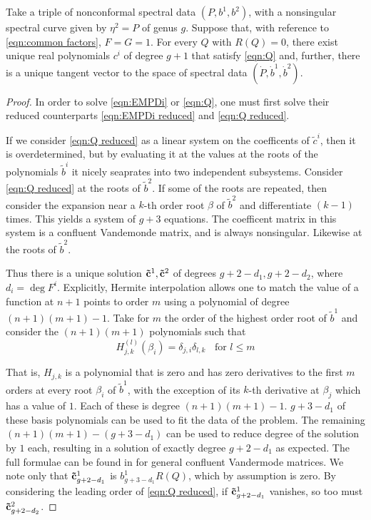 \begin{lem}[Nonconformal, $F=G=1$]
Take a triple of nonconformal spectral data $(P,b^1,b^2)$, with a nonsingular spectral curve given by $η^2 = P$ of genus $g$. Suppose that, with reference to \eqref{eqn:common factors}, $F=G=1$. For every $Q$ with $R(Q) = 0$, there exist unique real polynomials $c^i$ of degree $g+1$ that satisfy \eqref{eqn:Q} and, further, there is a unique tangent vector to the space of spectral data $(\dot P, \dot b^1, \dot b^2)$.

\begin{proof}
In order to solve \eqref{eqn:EMPDi} or \eqref{eqn:Q}, one must first solve their reduced counterparts \eqref{eqn:EMPDi reduced} and \eqref{eqn:Q reduced}.

If we consider \eqref{eqn:Q reduced} as a linear system on the coefficents of $\tilde{c}^i$, then it is overdetermined, but by evaluating it at the values at the roots of the polynomials $\tilde{b}^i$ it nicely seaprates into two independent subsystems. Consider \eqref{eqn:Q reduced} at the roots of $\tilde{b}^2$. If some of the roots are repeated, then consider the expansion near a $k$-th order root $β$ of $\tilde{b}^2$ and differentiate $(k-1)$ times. This yields a system of $g+3$ equations. The coefficent matrix in this system is a confluent Vandemonde matrix, and is always nonsingular. Likewise at the roots of $\tilde{b}^2$.

Thus there is a unique solution ${\bf \tilde{c}}^1, {\bf \tilde{c}}^2$ of degrees $g+2-d_1, g+2-d_2$, where $d_i = \deg F^i$. Explicitly, Hermite interpolation allows one to match the value of a function at $n+1$ points to order $m$ using a polynomial of degree $(n+1)(m+1)-1$. Take for $m$ the order of the highest order root of $\tilde{b}^1$ and consider the $(n+1)(m+1)$ polynomials such that
\[
H_{j,k}^{(l)}(β_i) = δ_{j,i}δ_{l,k}\;\;\text{ for }  l \leq m
\]

That is, $H_{j,k}$ is a polynomial that is zero and has zero derivatives to the first $m$ orders at every root $β_i$ of $\tilde{b}^1$, with the exception of its $k$-th derivative at $β_j$ which has a value of $1$. Each of these is degree $(n+1)(m+1)-1$. $g+3-d_1$ of these basis polynomials can be used to fit the data of the problem. The remaining $(n+1)(m+1)-(g+3-d_1)$ can be used to reduce degree of the solution by $1$ each, resulting in a solution of exactly degree $g+2-d_1$ as expected. The full formulae can be found in \cite{Spitzbart1960} for general confluent Vandermode matrices. We note only that ${\bf\tilde{c}}^1_{g+2-d_1}$ is $b^1_{g+3-d_1}R(Q)$, which by assumption is zero. By considering the leading order of \eqref{eqn:Q reduced}, if ${\bf\tilde{c}}^1_{g+2-d_1}$ vanishes, so too must ${\bf\tilde{c}}^2_{g+2-d_2}$.


\end{proof}
\end{lem}
